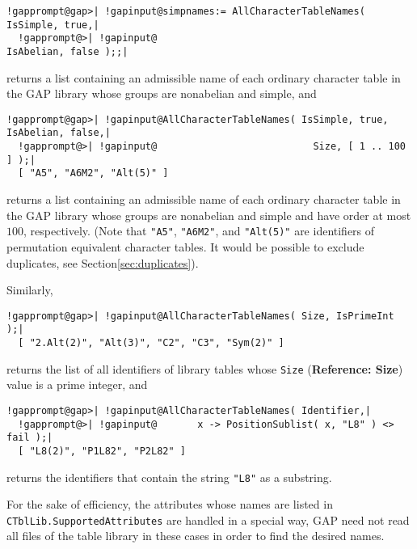 \documentclass[a4paper,11pt]{report}
\begin{document}
{{{ 
\begin{Verbatim}[commandchars=!@|,fontsize=\small,frame=single,label=Example]
  !gapprompt@gap>| !gapinput@simpnames:= AllCharacterTableNames( IsSimple, true,|
  !gapprompt@>| !gapinput@                                       IsAbelian, false );;|
\end{Verbatim}
 

 returns a list containing an admissible name of each ordinary character table
in the \textsf{GAP} library whose groups are nonabelian and simple, and 

 
\begin{Verbatim}[commandchars=!@|,fontsize=\small,frame=single,label=Example]
  !gapprompt@gap>| !gapinput@AllCharacterTableNames( IsSimple, true, IsAbelian, false,|
  !gapprompt@>| !gapinput@                           Size, [ 1 .. 100 ] );|
  [ "A5", "A6M2", "Alt(5)" ]
\end{Verbatim}
 

 returns a list containing an admissible name of each ordinary character table
in the \textsf{GAP} library whose groups are nonabelian and simple and have order at most $100$, respectively. (Note that \texttt{"A5"}, \texttt{"A6M2"}, and \texttt{"Alt(5)"} are identifiers of permutation equivalent character tables. It would be
possible to exclude duplicates, see Section{\nobreakspace}\ref{sec:duplicates}). 

 Similarly, 

 
\begin{Verbatim}[commandchars=!@|,fontsize=\small,frame=single,label=Example]
  !gapprompt@gap>| !gapinput@AllCharacterTableNames( Size, IsPrimeInt );|
  [ "2.Alt(2)", "Alt(3)", "C2", "C3", "Sym(2)" ]
\end{Verbatim}
 

 returns the list of all identifiers of library tables whose \texttt{Size} (\textbf{Reference: Size}) value is a prime integer, and 

 
\begin{Verbatim}[commandchars=!@|,fontsize=\small,frame=single,label=Example]
  !gapprompt@gap>| !gapinput@AllCharacterTableNames( Identifier,|
  !gapprompt@>| !gapinput@       x -> PositionSublist( x, "L8" ) <> fail );|
  [ "L8(2)", "P1L82", "P2L82" ]
\end{Verbatim}
 

 returns the identifiers that contain the string \texttt{"L8"} as a substring. 

 For the sake of efficiency, the attributes whose names are listed in \texttt{CTblLib.SupportedAttributes} are handled in a special way, \textsf{GAP} need not read all files of the table library in these cases in order to find
the desired names. 

}}}
\end{document}
